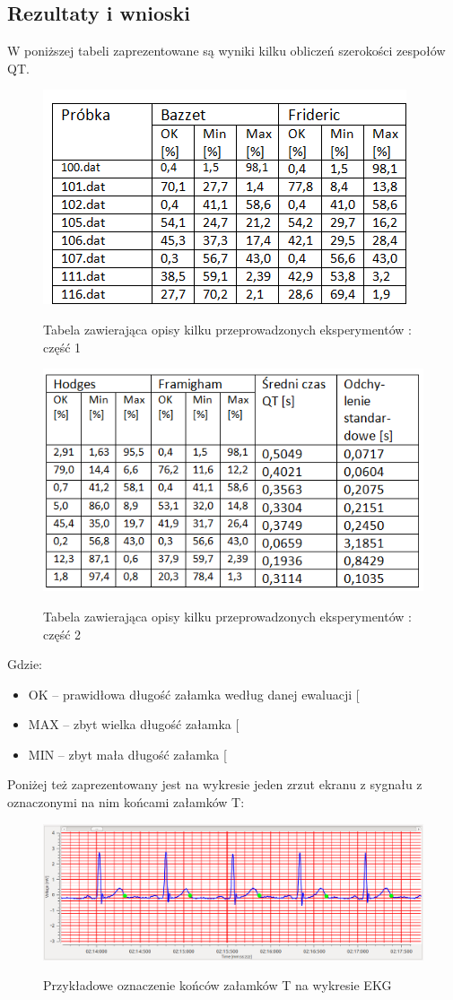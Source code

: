 \subsection{Rezultaty i wnioski}

W poniższej tabeli zaprezentowane są wyniki kilku obliczeń szerokości zespołów QT. 
\begin{figure}[H]
\centering
\includegraphics[scale=1.0]{QT_DISP/img/031}
\label{fig:Tabela1}
\caption{Tabela zawierająca opisy kilku przeprowadzonych eksperymentów : część 1}
\end{figure}

\begin{figure}[H]
\centering
\includegraphics[scale=1.0]{QT_DISP/img/032}
\label{fig:Tabela2}
\caption{Tabela zawierająca opisy kilku przeprowadzonych eksperymentów : część 2}
\end{figure}

Gdzie: 

\begin{itemize}
  \item OK – prawidłowa długość załamka według danej ewaluacji [%
  \item MAX – zbyt wielka długość załamka [%
  \item MIN – zbyt mała długość załamka [%
\end{itemize}

Poniżej też zaprezentowany jest na wykresie jeden zrzut ekranu z sygnału z oznaczonymi na nim końcami załamków T:
\begin{figure}[H]
\centering
\includegraphics[scale=0.6]{QT_DISP/img/04}
\label{fig:Wykres1}
\caption{Przykładowe oznaczenie końców załamków T na wykresie EKG}
\end{figure}
